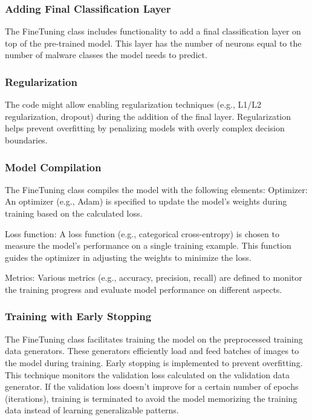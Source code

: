 \documentclass[conference]{IEEEtran}
\begin{document}
\subsubsection{Adding Final Classification Layer}

    The FineTuning class includes functionality to add a final classification layer on top of the pre-trained model. This layer has the number of neurons equal to the number of malware classes the model needs to predict.

\subsubsection{Regularization}

    The code might allow enabling regularization techniques (e.g., L1/L2 regularization, dropout) during the addition of the final layer. Regularization helps prevent overfitting by penalizing models with overly complex decision boundaries.

\subsubsection{Model Compilation}

    The FineTuning class compiles the model with the following elements:
        Optimizer: An optimizer (e.g., Adam) is specified to update the model's weights during training based on the calculated loss.
        
        Loss function: A loss function (e.g., categorical cross-entropy) is chosen to measure the model's performance on a single training example. This function guides the optimizer in adjusting the weights to minimize the loss.
        
        Metrics: Various metrics (e.g., accuracy, precision, recall) are defined to monitor the training progress and evaluate model performance on different aspects.

\subsubsection{Training with Early Stopping}

    The FineTuning class   facilitates training the model on the preprocessed training data generators. These generators efficiently load and feed batches of images to the model during training.
    Early stopping is implemented to prevent overfitting. This technique monitors the validation loss calculated on the validation data generator. If the validation loss doesn't improve for a certain number of epochs (iterations), training is terminated to avoid the model memorizing the training data instead of learning generalizable patterns.
\end{document}
